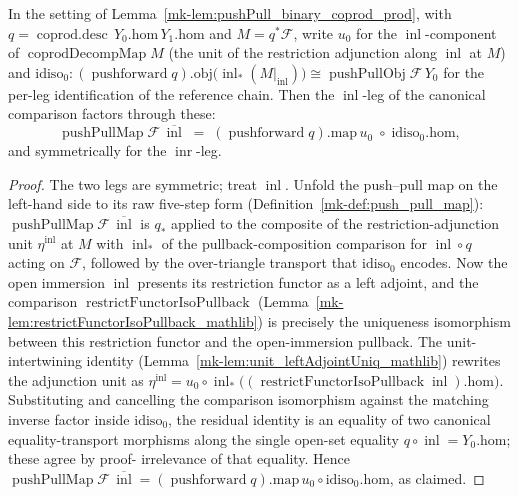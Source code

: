 \begin{lemma}\label{mk-lem:pushPull_binary_leg_coherence}
  \leanok

  In the setting of Lemma~\ref{mk-lem:pushPull_binary_coprod_prod}, with \(q =
  \operatorname{coprod.desc}\,Y_0.\mathrm{hom}\,Y_1.\mathrm{hom}\) and \(M = q^*\mathcal{F}\), write
  \(u_0\) for the \(\operatorname{inl}\)-component of \(\operatorname{coprodDecompMap} M\) (the unit of
  the restriction adjunction along \(\operatorname{inl}\) at \(M\)) and \(\mathrm{idiso}_0 :
  (\operatorname{pushforward} q).\mathrm{obj}\bigl(\operatorname{inl}_*(M|_{\operatorname{inl}})\bigr)
  \cong \operatorname{pushPullObj}\mathcal{F}\,Y_0\) for the per-leg identification of the reference
  chain. Then the \(\operatorname{inl}\)-leg of the canonical comparison factors through these:
  \[
    \operatorname{pushPullMap}\mathcal{F}\,\overline{\operatorname{inl}}
      \;=\; (\operatorname{pushforward} q).\mathrm{map}\, u_0 \;\circ\; \mathrm{idiso}_0.\mathrm{hom},
  \]
  and symmetrically for the \(\operatorname{inr}\)-leg.
\end{lemma}
\begin{proof}
  The two legs are symmetric; treat \(\operatorname{inl}\). Unfold the push--pull map on the
  left-hand side to its raw five-step form (Definition~\ref{mk-def:push_pull_map}):
  \(\operatorname{pushPullMap}\mathcal{F}\,\overline{\operatorname{inl}}\) is \(q_*\) applied to the
  composite of the restriction-adjunction unit \(\eta^{\operatorname{inl}}\) at \(M\) with
  \(\operatorname{inl}_*\) of the pullback-composition comparison for \(\operatorname{inl} \circ q\)
  acting on \(\mathcal{F}\), followed by the over-triangle transport that \(\mathrm{idiso}_0\)
  encodes. Now the open immersion \(\operatorname{inl}\) presents its restriction functor as a left
  adjoint, and the comparison \(\operatorname{restrictFunctorIsoPullback}\)
  (Lemma~\ref{mk-lem:restrictFunctorIsoPullback_mathlib}) is precisely the uniqueness isomorphism
  between this restriction functor and the open-immersion pullback. The unit-intertwining identity
  (Lemma~\ref{mk-lem:unit_leftAdjointUniq_mathlib}) rewrites the adjunction unit as
  \(\eta^{\operatorname{inl}} = u_0 \circ \operatorname{inl}_*\bigl(
  (\operatorname{restrictFunctorIsoPullback}\operatorname{inl}).\mathrm{hom}\bigr)\). Substituting and
  cancelling the comparison isomorphism against the matching inverse factor inside \(\mathrm{idiso}_0\),
  the residual identity is an equality of two canonical equality-transport morphisms along the single
  open-set equality \(q \circ \operatorname{inl} = Y_0.\mathrm{hom}\); these agree by proof-%
  irrelevance of that equality. Hence \(\operatorname{pushPullMap}\mathcal{F}\,
  \overline{\operatorname{inl}} = (\operatorname{pushforward} q).\mathrm{map}\, u_0 \circ
  \mathrm{idiso}_0.\mathrm{hom}\), as claimed.
\end{proof}

